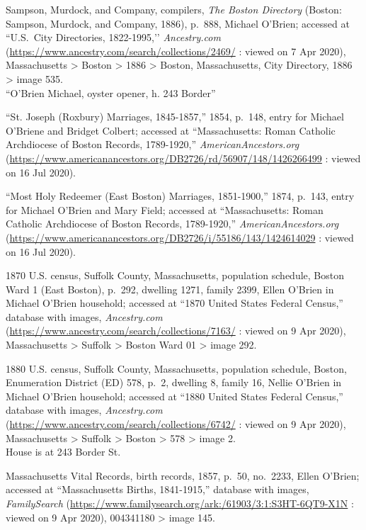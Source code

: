\begin{thebibliography}{999}
	Sampson, Murdock, and Company, compilers, \textit{The Boston Directory} (Boston: Sampson, Murdock, and Company, 1886), p.\ 888, Michael O'Brien; accessed at ``U.S.\ City Directories, 1822-1995,’’ \textit{Ancestry.com} (\url{https://www.ancestry.com/search/collections/2469/} : viewed on 7 Apr 2020), Massachusetts > Boston > 1886 > Boston, Massachusetts, City Directory, 1886 > image 535.\\
	``O'Brien Michael, oyster opener, h. 243 Border''
	
	``St. Joseph (Roxbury) Marriages, 1845-1857,'' 1854, p.\ 148, entry for Michael O'Briene and Bridget Colbert; accessed at ``Massachusetts: Roman Catholic Archdiocese of Boston Records, 1789-1920,'' \textit{AmericanAncestors.org} (\url{https://www.americanancestors.org/DB2726/rd/56907/148/1426266499} : viewed on 16 Jul 2020).
	
	``Most Holy Redeemer (East Boston) Marriages, 1851-1900,'' 1874, p.\ 143, entry for Michael O'Brien and Mary Field; accessed at ``Massachusetts: Roman Catholic Archdiocese of Boston Records, 1789-1920,'' \textit{AmericanAncestors.org} (\url{https://www.americanancestors.org/DB2726/i/55186/143/1424614029} : viewed on 16 Jul 2020).
	
	1870 U.S. census, Suffolk County, Massachusetts, population schedule, Boston Ward 1 (East Boston), p.\ 292, dwelling 1271, family 2399, Ellen O'Brien in Michael O'Brien household; accessed at ``1870 United States Federal Census,'' database with images, \textit{Ancestry.com} (\url{https://www.ancestry.com/search/collections/7163/} : viewed on 9 Apr 2020), Massachusetts > Suffolk > Boston Ward 01 > image 292.
	
	1880 U.S. census, Suffolk County, Massachusetts, population schedule, Boston, Enumeration District (ED) 578, p.\ 2, dwelling 8, family 16, Nellie O'Brien in Michael O'Brien household; accessed at ``1880 United States Federal Census,'' database with images, \textit{Ancestry.com} (\url{https://www.ancestry.com/search/collections/6742/} : viewed on 9 Apr 2020), Massachusetts > Suffolk > Boston > 578 > image 2.\\
	House is at 243 Border St.
	
	Massachusetts Vital Records, birth records, 1857, p.\ 50, no.\ 2233, Ellen O'Brien; accessed at ``Massachusetts Births, 1841-1915,'' database with images, \textit{FamilySearch} (\url{https://www.familysearch.org/ark:/61903/3:1:S3HT-6QT9-X1N} : viewed on 9 Apr 2020), 004341180 > image 145.
	

\end{thebibliography}
